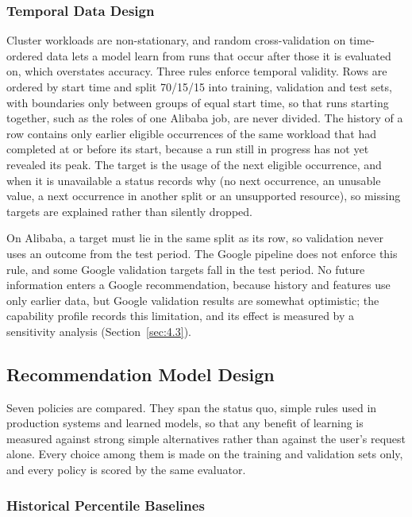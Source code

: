 \subsubsection{Temporal Data Design}\label{sec:4.1.7}

Cluster workloads are non-stationary, and random cross-validation on time-ordered data lets a model learn from runs that occur after those it is evaluated on, which overstates accuracy. Three rules enforce temporal validity. Rows are ordered by start time and split 70/15/15 into training, validation and test sets, with boundaries only between groups of equal start time, so that runs starting together, such as the roles of one Alibaba job, are never divided. The history of a row contains only earlier eligible occurrences of the same workload that had completed at or before its start, because a run still in progress has not yet revealed its peak. The target is the usage of the next eligible occurrence, and when it is unavailable a status records why (no next occurrence, an unusable value, a next occurrence in another split or an unsupported resource), so missing targets are explained rather than silently dropped.

On Alibaba, a target must lie in the same split as its row, so validation never uses an outcome from the test period. The Google pipeline does not enforce this rule, and some Google validation targets fall in the test period. No future information enters a Google recommendation, because history and features use only earlier data, but Google validation results are somewhat optimistic; the capability profile records this limitation, and its effect is measured by a sensitivity analysis (Section~\ref{sec:4.3}).

\subsection{Recommendation Model Design}\label{sec:4.2}

Seven policies are compared. They span the status quo, simple rules used in production systems and learned models, so that any benefit of learning is measured against strong simple alternatives rather than against the user's request alone. Every choice among them is made on the training and validation sets only, and every policy is scored by the same evaluator.

\subsubsection{Historical Percentile Baselines}\label{sec:4.2.1}

